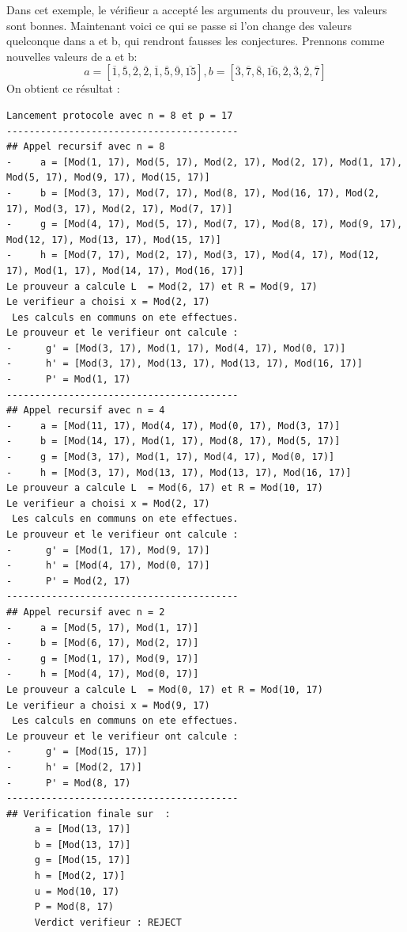 \documentclass[a4paper]{article}
\theoremstyle{theorem}
\theoremstyle{definition}
\begin{document}
Dans cet exemple, le vérifieur a accepté les arguments du prouveur, les valeurs sont bonnes. Maintenant voici ce qui se passe si l'on change des valeurs quelconque dans a et b, qui rendront fausses les conjectures. Prennons comme nouvelles valeurs  de a et b: 
 \[ a = [\overline{1} ,\overline{5} ,\overline{2} ,\overline{2} ,\overline{1} ,\overline{5} ,\overline{9} ,\overline{15} ] , b = [\overline{3} ,\overline{7} ,\overline{8} ,\overline{16} ,\overline{2} ,\overline{3} ,\overline{2} ,\overline{7}]\]
On obtient ce résultat : 
 \begin{Verbatim}[frame=single, fontsize=\scriptsize]
     Lancement protocole avec n = 8 et p = 17
-----------------------------------------
## Appel recursif avec n = 8
-     a = [Mod(1, 17), Mod(5, 17), Mod(2, 17), Mod(2, 17), Mod(1, 17), Mod(5, 17), Mod(9, 17), Mod(15, 17)]
-     b = [Mod(3, 17), Mod(7, 17), Mod(8, 17), Mod(16, 17), Mod(2, 17), Mod(3, 17), Mod(2, 17), Mod(7, 17)]
-     g = [Mod(4, 17), Mod(5, 17), Mod(7, 17), Mod(8, 17), Mod(9, 17), Mod(12, 17), Mod(13, 17), Mod(15, 17)]
-     h = [Mod(7, 17), Mod(2, 17), Mod(3, 17), Mod(4, 17), Mod(12, 17), Mod(1, 17), Mod(14, 17), Mod(16, 17)]  
Le prouveur a calcule L  = Mod(2, 17) et R = Mod(9, 17)  
Le verifieur a choisi x = Mod(2, 17)  
 Les calculs en communs on ete effectues.  
Le prouveur et le verifieur ont calcule :   
-      g' = [Mod(3, 17), Mod(1, 17), Mod(4, 17), Mod(0, 17)] 
-      h' = [Mod(3, 17), Mod(13, 17), Mod(13, 17), Mod(16, 17)] 
-      P' = Mod(1, 17)
-----------------------------------------
## Appel recursif avec n = 4
-     a = [Mod(11, 17), Mod(4, 17), Mod(0, 17), Mod(3, 17)]
-     b = [Mod(14, 17), Mod(1, 17), Mod(8, 17), Mod(5, 17)]
-     g = [Mod(3, 17), Mod(1, 17), Mod(4, 17), Mod(0, 17)]
-     h = [Mod(3, 17), Mod(13, 17), Mod(13, 17), Mod(16, 17)]  
Le prouveur a calcule L  = Mod(6, 17) et R = Mod(10, 17)  
Le verifieur a choisi x = Mod(2, 17)  
 Les calculs en communs on ete effectues.  
Le prouveur et le verifieur ont calcule :   
-      g' = [Mod(1, 17), Mod(9, 17)] 
-      h' = [Mod(4, 17), Mod(0, 17)] 
-      P' = Mod(2, 17)
-----------------------------------------
## Appel recursif avec n = 2
-     a = [Mod(5, 17), Mod(1, 17)]
-     b = [Mod(6, 17), Mod(2, 17)]
-     g = [Mod(1, 17), Mod(9, 17)]
-     h = [Mod(4, 17), Mod(0, 17)]  
Le prouveur a calcule L  = Mod(0, 17) et R = Mod(10, 17)  
Le verifieur a choisi x = Mod(9, 17)  
 Les calculs en communs on ete effectues.  
Le prouveur et le verifieur ont calcule :   
-      g' = [Mod(15, 17)] 
-      h' = [Mod(2, 17)] 
-      P' = Mod(8, 17)
-----------------------------------------
## Verification finale sur  :  
     a = [Mod(13, 17)]  
     b = [Mod(13, 17)]  
     g = [Mod(15, 17)]  
     h = [Mod(2, 17)]  
     u = Mod(10, 17)  
     P = Mod(8, 17)  
     Verdict verifieur : REJECT

 \end{Verbatim}
\end{document}
